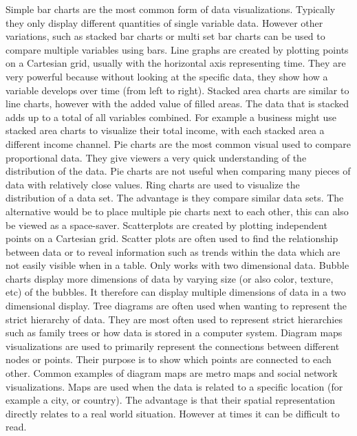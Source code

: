 Simple bar charts are the most common form of data visualizations. Typically they only display different quantities of single variable data. However other variations, such as stacked bar charts or multi set bar charts can be used to compare multiple variables using bars. Line graphs are created by plotting points on a Cartesian grid, usually with the horizontal axis representing time. They are very powerful because without looking at the specific data, they show how a variable develops over time (from left to right). Stacked area charts are similar to line charts, however with the added value of filled areas. The data that is stacked adds up to a total of all variables combined. For example a business might use stacked area charts to visualize their total income, with each stacked area a different income channel. Pie charts are the most common visual used to compare proportional data. They give viewers a very quick understanding of the distribution of the data. Pie charts are not useful when comparing many pieces of data with relatively close values. Ring charts are used to visualize the distribution of a data set. The advantage is they compare similar data sets. The alternative would be to place multiple pie charts next to each other, this can also be viewed as a space-saver. Scatterplots are created by plotting independent points on a Cartesian grid. Scatter plots are often used to find the relationship between data or to reveal information such as trends within the data which are not easily visible when in a table. Only works with two dimensional data. Bubble charts display more dimensions of data by varying size (or also color, texture, etc) of the bubbles. It therefore can display multiple dimensions of data in a two dimensional display. Tree diagrams are often used when wanting to represent the strict hierarchy of data. They are most often used to represent strict hierarchies such as family trees or how data is stored in a computer system. Diagram maps visualizations are used to primarily represent the connections between different nodes or points. Their purpose is to show which points are connected to each other. Common examples of diagram maps are metro maps and social network visualizations. Maps are used when the data is related to a specific location (for example a city, or country). The advantage is that their spatial representation directly relates to a real world situation. However at times it can be difficult to read.


